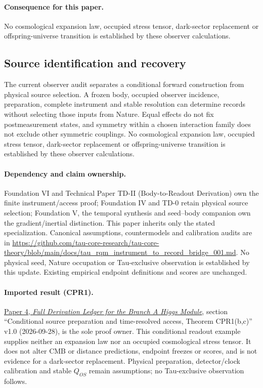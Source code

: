 \documentclass[11pt]{article}
\begin{document}
\paragraph{Consequence for this paper.}
No cosmological expansion law, occupied stress tensor, dark-sector replacement or offspring-universe transition is established by these observer calculations.

\subsection{Source identification and recovery}
The current observer audit separates a conditional forward construction from physical source selection. A frozen body, occupied observer incidence, preparation, complete instrument and stable resolution can determine records without selecting those inputs from Nature. Equal effects do not fix postmeasurement states, and symmetry within a chosen interaction family does not exclude other symmetric couplings. No cosmological expansion law, occupied stress tensor, dark-sector replacement or offspring-universe transition is established by these observer calculations.

\paragraph{Dependency and claim ownership.}
Foundation VI and Technical Paper TD-II (Body-to-Readout Derivation) own the finite instrument/access proof; Foundation IV and TD-0 retain physical source selection; Foundation V, the temporal synthesis and seed--body companion own the gradient/inertial distinction. This paper inherits only the stated specialization. Canonical assumptions, countermodels and calibration audits are in \url{https://github.com/tau-core-research/tau-core-theory/blob/main/docs/tau_rqm_instrument_to_record_bridge_001.md}. No physical seed, Nature occupation or Tau-exclusive observation is established by this update. Existing empirical endpoint definitions and scores are unchanged.

\paragraph{Imported result (CPR1).}
\href{https://github.com/tau-core-research/tau-core-higgs-module-paper4/blob/main/paper4_full_derivation/full_derivation.pdf#nameddest=cpr1}{Paper 4, \emph{Full Derivation Ledger for the Branch A Higgs Module}}, section ``Conditional source preparation and time-resolved access, Theorem CPR1(b,c)'' v1.0 (2026-09-28), is the sole proof owner.
This conditional readout example supplies neither an expansion law nor an occupied cosmological stress tensor. It does not alter CMB or distance predictions, endpoint freezes or scores, and is not evidence for a dark-sector replacement.
Physical preparation, detector/clock calibration and stable $Q_{OS}$ remain assumptions; no Tau-exclusive observation follows.
\end{document}
